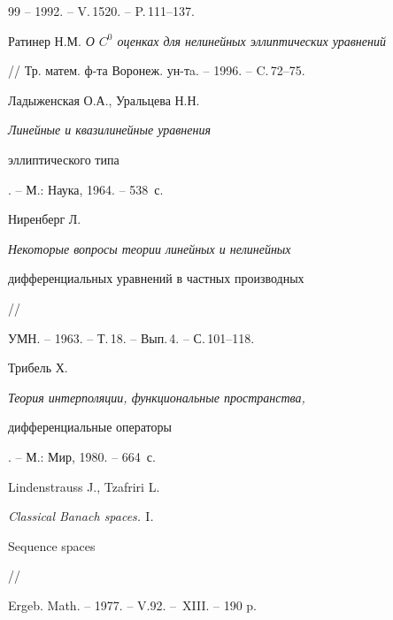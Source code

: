 \begin{thebibliography}{99}
-- 1992. -- V.\,1520. -- P.\,111--137.




Ратинер Н.М. {\em О $C^0$ оценках для нелинейных эллиптических уравнений}


// Тр. матем. ф-та Воронеж. ун-тa. -- 1996. -- C.\,72--75.




Ладыженская О.А., Уральцева Н.Н. {\em Линейные и квазилинейные уравнения


эллиптического типа}. -- М.: Наука, 1964. -- 538~с.




Ниренберг Л. {\em Некоторые вопросы теории линейных и нелинейных


дифференциальных уравнений в частных производных} //


УМН. -- 1963. -- Т.\,18. -- Вып.\,4. -- С.\,101--118.




Трибель Х. {\em Теория интерполяции, функциональные пространства,


дифференциальные операторы}. -- М.: Мир, 1980. -- 664~с.




Lindenstrauss J., Tzafriri L. {\em Classical Banach spaces. $\mathrm I$.


Sequence spaces} //


Ergeb. Math. -- 1977. -- V.92. -- \No\,XIII. -- 190 p.





\end{thebibliography}





\vskip 2cm












\label{end}








